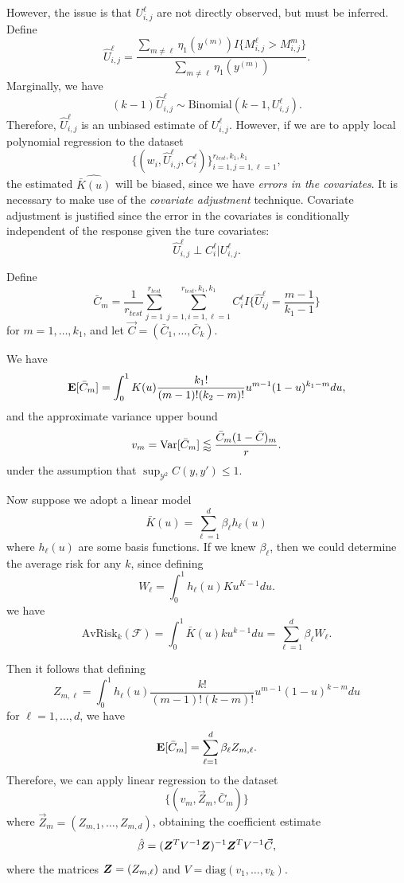 \documentclass[12pt]{article}
\begin{document}
However, the issue is that $U_{i,j}^\ell$ are not directly observed, but must be inferred.
Define
\[
\hat{U}_{i,j}^\ell = \frac{\sum_{m \neq \ell} \eta_1(y^{(m)}) I\{M_{i, j}^\ell > M_{i, j}^m\}}{\sum_{m \neq \ell} \eta_1(y^{(m)})}.
\]
Marginally, we have
\[
(k-1)\hat{U}_{i, j}^\ell \sim \text{Binomial}(k-1, U_{i, j}^\ell).
\]
Therefore, $\hat{U}_{i, j}^\ell$ is an unbiased estimate of $U_{i, j}^\ell$.
However, if we are to apply local polynomial regression to the dataset
\[
\{(w_i, \hat{U}_{i,j}^\ell, C_i^\ell)\}_{i=1, j=1, \ell=1}^{r_{test}, k_1,k_1},
\]
the estimated $\widehat{\bar{K}(u)}$ will be biased, since we have
\emph{errors in the covariates}.  It is necessary to make use of the
\emph{covariate adjustment} technique.  Covariate adjustment is
justified since the error in the covariates is conditionally
independent of the response given the ture covariates:
\[
\hat{U}_{i,j}^\ell \perp C_i^\ell | U_{i, j}^\ell.
\]

Define
\[
\bar{C}_m = \frac{1}{r_{test}}\sum_{j=1}^{r_{test}} \sum_{j=1, i=1, \ell = 1}^{r_{test}, k_1, k_1} C_i^\ell I\{\hat{U}_{ij}^\ell = \frac{m-1}{k_1-1}\}
\]
for $m = 1,\hdots, k_1$, and let $\vec{C} = (\bar{C}_1,\hdots,
\bar{C}_k)$.

We have
\[
\textbf{E}[\bar{C}_m] = \int_0^1 K(u) \frac{k_1!}{(m-1)!(k_2-m)!} u^{m-1} (1-u)^{k_1-m}  du,
\]
and the approximate variance upper bound
\[
v_m = \text{Var}[\bar{C}_m] \lessapprox \frac{\bar{C}_m (1-\bar{C})_m}{r}.
\]
under the assumption that $\sup_{\mathcal{Y}^2} C(y, y') \leq 1$.

Now suppose we adopt a linear model
\[
\bar{K}(u) = \sum_{\ell=1}^d \beta_\ell h_\ell(u)
\]
where $h_\ell(u)$ are some basis functions.
If we knew $\beta_\ell$, then we could determine the average risk for any $k$, since
defining
\[
W_\ell = \int_0^1 h_\ell(u) K u^{K-1} du.
\]
we have
\begin{equation}\label{eq:avgrisk_linmod}
\text{AvRisk}_k(\mathcal{F}) = \int_0^1 \bar{K}(u) k u^{k-1} du = \sum_{\ell=1}^d \beta_\ell W_\ell.
\end{equation}



Then it follows that
defining
\[
Z_{m, \ell} = \int_0^1 h_\ell(u) \frac{k!}{(m-1)!(k-m)!} u^{m-1} (1-u)^{k-m} du
\]
for $\ell = 1,\hdots, d$, we have
\[
\textbf{E}[\bar{C}_m] = \sum_{\ell = 1}^d \beta_\ell Z_{m, \ell}.
\]
Therefore, we can apply linear regression to the dataset
\[
\{(v_m, \vec{Z}_m, \bar{C}_m)\}
\]
where $\vec{Z}_m = (Z_{m, 1},\hdots, Z_{m, d})$,
obtaining the coefficient estimate
\[
\hat{\beta} = (\boldsymbol{Z}^T V^{-1} \boldsymbol{Z})^{-1} \boldsymbol{Z}^T V^{-1} \vec{C},
\]
where the matrices $\boldsymbol{Z} = (Z_{m, \ell})$ and $V =
\text{diag}(v_1,\hdots, v_k)$.
\end{document}
